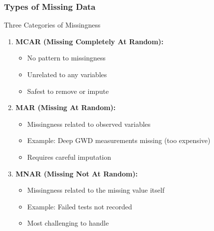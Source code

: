 \documentclass[aspectratio=169]{beamer}
\begin{document}
\begin{frame}
\frametitle{Types of Missing Data}

\begin{block}{Three Categories of Missingness}
\begin{enumerate}
    \item \textbf{MCAR (Missing Completely At Random):}
    \begin{itemize}
        \item No pattern to missingness
        \item Unrelated to any variables
        \item Safest to remove or impute
    \end{itemize}

    \item \textbf{MAR (Missing At Random):}
    \begin{itemize}
        \item Missingness related to observed variables
        \item Example: Deep GWD measurements missing (too expensive)
        \item Requires careful imputation
    \end{itemize}

    \item \textbf{MNAR (Missing Not At Random):}
    \begin{itemize}
        \item Missingness related to the missing value itself
        \item Example: Failed tests not recorded
        \item Most challenging to handle
    \end{itemize}
\end{enumerate}
\end{block}

\end{frame}
\end{document}
